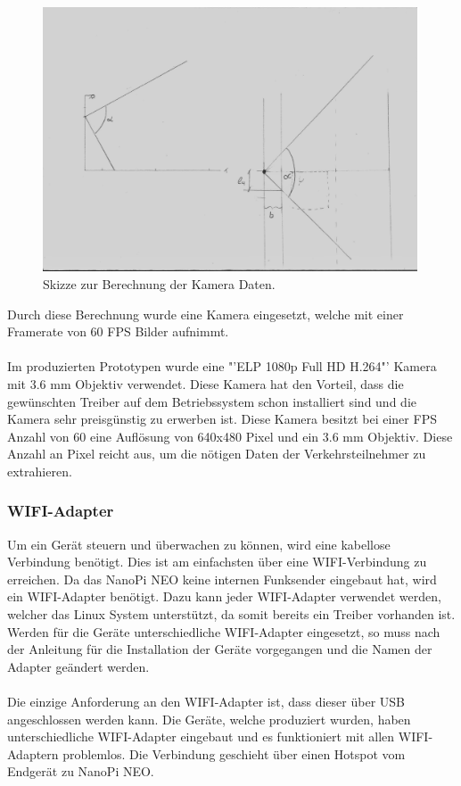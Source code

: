 \begin{figure}[H]
  \centering
  \includegraphics[width=0.99\textwidth]{Hardware/ObjektivBerechnung.jpg} 
  \caption{Skizze zur Berechnung der Kamera Daten.}
  \label{bBerechnung}
\end{figure}

Durch diese Berechnung wurde eine Kamera eingesetzt, welche mit einer Framerate von 60 FPS Bilder aufnimmt. \\\\
Im produzierten Prototypen wurde eine "'ELP 1080p Full HD H.264"' Kamera mit 3.6 mm Objektiv verwendet. Diese Kamera hat den Vorteil, dass die gewünschten Treiber auf dem Betriebssystem schon installiert sind und die Kamera sehr preisgünstig zu erwerben ist. Diese Kamera besitzt bei einer FPS Anzahl von 60 eine Auflösung von 640x480 Pixel und ein 3.6 mm Objektiv. Diese Anzahl an Pixel reicht aus, um die nötigen Daten der Verkehrsteilnehmer zu extrahieren. \cite{Kamera}

\subsubsection{WIFI-Adapter}
Um ein Gerät steuern und überwachen zu können, wird eine kabellose Verbindung benötigt. Dies ist am einfachsten über eine WIFI-Verbindung zu erreichen. Da das NanoPi NEO keine internen Funksender eingebaut hat, wird ein WIFI-Adapter benötigt. Dazu kann jeder WIFI-Adapter verwendet werden, welcher das Linux System unterstützt, da somit bereits ein Treiber vorhanden ist. Werden für die Geräte unterschiedliche WIFI-Adapter eingesetzt, so muss nach der Anleitung für die Installation der Geräte vorgegangen und die Namen der Adapter geändert werden.\\\\
Die einzige Anforderung an den WIFI-Adapter ist, dass dieser über USB angeschlossen werden kann. Die Geräte, welche produziert wurden, haben unterschiedliche WIFI-Adapter eingebaut und es funktioniert mit allen WIFI-Adaptern problemlos. Die Verbindung geschieht über einen Hotspot vom Endgerät zu NanoPi NEO.

